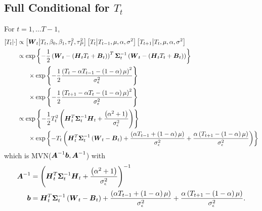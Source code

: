 \documentclass{article}\usepackage[]{graphicx}\usepackage[]{color}
\def\bm#1{\mbox{\boldmath $#1$}}
\begin{document}
\subsection{Full Conditional for $T_t$}
%
For $t = 1, \ldots T - 1$,
%
\begin{align*}
%
\left[ T_t \middle| \cdot \right] & \propto \left[ \bm{W}_t \middle| T_t, \beta_0, \beta_1, \tau^2_I, \tau^2_P \right] \left[ T_t \middle| T_{t - 1}, \mu, \alpha, \sigma^2 \right] \left[ T_{t + 1} \middle| T_t, \mu, \alpha, \sigma^2 \right]\\
%
& \propto \exp{ \left\{ - \frac{1} {2} \left( \bm{W}_t - \left( \bm{H}_t T_t + \bm{B}_t \right) \right)^T \bm{\Sigma}_t^{ - 1} \left( \bm{W}_t - \left( \bm{H}_t T_t + \bm{B}_t \right)  \right) \right\} }\\
& \hspace{6mm} \times \exp{ \left\{ - \frac{1} {2} \frac{\left( T_t - \alpha T_{t - 1} - \left( 1 - \alpha \right) \mu \right)^2} {\sigma^2_\epsilon} \right\} }\\
& \hspace{6mm} \times \exp{ \left\{ - \frac{1} {2} \frac{\left( T_{t + 1} - \alpha T_t - \left( 1 - \alpha \right) \mu \right)^2} {\sigma^2_\epsilon} \right\} }\\
%
& \propto \exp{ \left\{ - \frac{1} {2} T_t^2 \left( \bm{H}_t^T \bm{\Sigma}_t^{ - 1} \bm{H}_t + \frac{ \left( \alpha^2 + 1 \right) } {\sigma^2_\epsilon} \right) \right\} }\\
& \hspace{6mm} \times \exp{ \left\{ - T_t \left( \bm{H}_t^T \bm{\Sigma}_t^{ - 1} \left( \bm{W}_t - \bm{B}_t \right) + \frac{\left( \alpha T_{t - 1} + \left( 1 - \alpha \right) \mu \right)} {\sigma^2_\epsilon} + \frac{ \alpha \left( T_{t + 1} - \left( 1 - \alpha \right) \mu \right)} {\sigma^2_\epsilon}  \right) \right\} }
%
\end{align*}
%
which is MVN($\bm{A}^{ - 1}\bm{b}, \bm{A}^{ - 1}$) with \\
%
\begin{align*}
%
\bm{A}^{ - 1} & = \left( \bm{H}_t^T \bm{\Sigma}_t^{ - 1} \bm{H}_t + \frac{\left( \alpha^2 + 1 \right)} {\sigma^2_\epsilon} \right)^{ - 1} \\ 
%
\bm{b} & = \bm{H}_t^T \bm{\Sigma}_t^{ - 1} \left( \bm{W}_t - \bm{B}_t \right) + \frac{\left( \alpha T_{t - 1} + \left( 1 - \alpha \right) \mu \right)} {\sigma^2_\epsilon} + \frac{\alpha \left( T_{t + 1} - \left( 1 - \alpha \right) \mu \right)} {\sigma^2_\epsilon} .\\
%
\end{align*}
\end{document}
